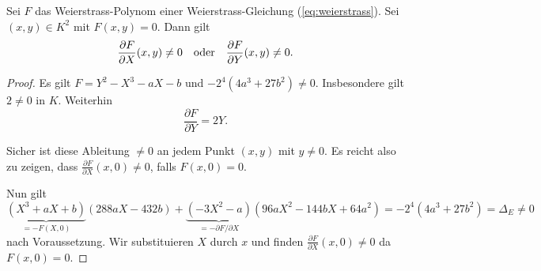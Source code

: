 \begin{lemma}
  \label{lem:smooth}
  Sei $F$ das Weierstrass-Polynom einer Weierstrass-Gleichung
  (\ref{eq:weierstrass}). Sei $(x,y)\in K^2$ mit $F(x,y)=0$. Dann
  gilt
  \begin{equation*}
    \frac{\partial F}{\partial X}(x,y)\not=0 \quad\text{oder}\quad
    \frac{\partial F}{\partial Y}(x,y)\not=0.
  \end{equation*}
\end{lemma}
\begin{proof}
  Es gilt $F = Y^2 - X^3-aX-b$ und $-2^4(4a^3+27b^2)\not=0$.
  Insbesondere gilt $2\not=0$ in $K$. Weiterhin
  \begin{equation*}
    \frac{\partial F}{\partial Y} = 2Y. 
  \end{equation*}

  Sicher ist diese Ableitung $\not=0$ an jedem Punkt $(x,y)$ mit
  $y\not=0$.
  Es reicht also zu zeigen, dass $    \frac{\partial F}{\partial
    X}(x,0)\not=0$, falls $F(x,0)=0$.

  Nun gilt
  \begin{equation*}
    \underbrace{(X^3+aX+b)}_{=-F(X,0)}(288aX-432b) +
    \underbrace{(-3X^2-a)}_{= -\partial F/\partial X}(96aX^2 - 144bX + 64a^2)
    = -2^4(4a^3+27b^2) =\Delta_E\not= 0
  \end{equation*}
  nach Voraussetzung.
  Wir substituieren $X$ durch $x$ und finden 
  $\frac{\partial F}{\partial
    X}(x,0)\not=0$ da $F(x,0)=0$.  
\end{proof}

